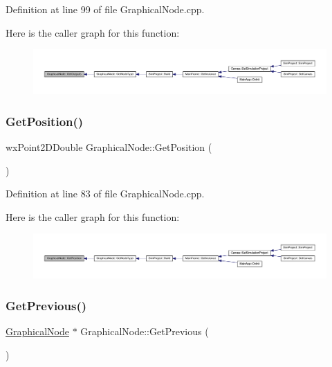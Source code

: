Definition at line 99 of file Graphical\+Node.\+cpp.

Here is the caller graph for this function\+:
\nopagebreak
\begin{figure}[H]
\begin{center}
\leavevmode
\includegraphics[width=350pt]{class_graphical_node_a2d4169669b106f7351178e4fbc60be85_icgraph}
\end{center}
\end{figure}
\mbox{\label{class_graphical_node_a87de11aad81e7b4a3baf53d47034e5f5}} 
\subsubsection{\texorpdfstring{Get\+Position()}{GetPosition()}}
{\footnotesize\ttfamily wx\+Point2\+D\+Double Graphical\+Node\+::\+Get\+Position (\begin{DoxyParamCaption}{ }\end{DoxyParamCaption})}



Definition at line 83 of file Graphical\+Node.\+cpp.

Here is the caller graph for this function\+:
\nopagebreak
\begin{figure}[H]
\begin{center}
\leavevmode
\includegraphics[width=350pt]{class_graphical_node_a87de11aad81e7b4a3baf53d47034e5f5_icgraph}
\end{center}
\end{figure}
\mbox{\label{class_graphical_node_a2e097f9b7b10970e20c530176a5e50b2}} 
\subsubsection{\texorpdfstring{Get\+Previous()}{GetPrevious()}}
{\footnotesize\ttfamily \hyperlink{class_graphical_node}{Graphical\+Node} $\ast$ Graphical\+Node\+::\+Get\+Previous (\begin{DoxyParamCaption}{ }\end{DoxyParamCaption})}



